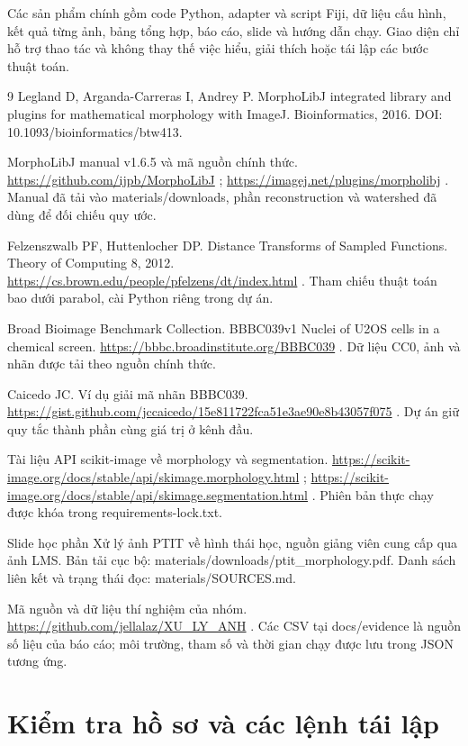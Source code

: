 \documentclass[12pt,a4paper,oneside]{report}
\begin{document}
Các sản phẩm chính gồm code Python, adapter và script Fiji, dữ liệu cấu hình, kết quả từng ảnh, bảng tổng hợp, báo cáo, slide và hướng dẫn chạy. Giao diện chỉ hỗ trợ thao tác và không thay thế việc hiểu, giải thích hoặc tái lập các bước thuật toán.
\clearpage{}\begin{thebibliography}{9}
 Legland D, Arganda-Carreras I, Andrey P. MorphoLibJ integrated library and plugins for mathematical morphology with ImageJ. Bioinformatics, 2016. DOI: 10.1093/bioinformatics/btw413.

 MorphoLibJ manual v1.6.5 và mã nguồn chính thức. \url{https://github.com/ijpb/MorphoLibJ} ; \url{https://imagej.net/plugins/morpholibj} . Manual đã tải vào materials/downloads, phần reconstruction và watershed đã dùng để đối chiếu quy ước.

 Felzenszwalb PF, Huttenlocher DP. Distance Transforms of Sampled Functions. Theory of Computing 8, 2012. \url{https://cs.brown.edu/people/pfelzens/dt/index.html} . Tham chiếu thuật toán bao dưới parabol, cài Python riêng trong dự án.

 Broad Bioimage Benchmark Collection. BBBC039v1 Nuclei of U2OS cells in a chemical screen. \url{https://bbbc.broadinstitute.org/BBBC039} . Dữ liệu CC0, ảnh và nhãn được tải theo nguồn chính thức.

 Caicedo JC. Ví dụ giải mã nhãn BBBC039. \url{https://gist.github.com/jccaicedo/15e811722fca51e3ae90e8b43057f075} . Dự án giữ quy tắc thành phần cùng giá trị ở kênh đầu.

 Tài liệu API scikit-image về morphology và segmentation. \url{https://scikit-image.org/docs/stable/api/skimage.morphology.html} ; \url{https://scikit-image.org/docs/stable/api/skimage.segmentation.html} . Phiên bản thực chạy được khóa trong requirements-lock.txt.

 Slide học phần Xử lý ảnh PTIT về hình thái học, nguồn giảng viên cung cấp qua ảnh LMS. Bản tải cục bộ: materials/downloads/ptit\_morphology.pdf. Danh sách liên kết và trạng thái đọc: materials/SOURCES.md.

 Mã nguồn và dữ liệu thí nghiệm của nhóm. \url{https://github.com/jellalaz/XU_LY_ANH} . Các CSV tại docs/evidence là nguồn số liệu của báo cáo; môi trường, tham số và thời gian chạy được lưu trong JSON tương ứng.

\end{thebibliography}\appendix\chapter{Kiểm tra hồ sơ và các lệnh tái lập}
\end{document}
